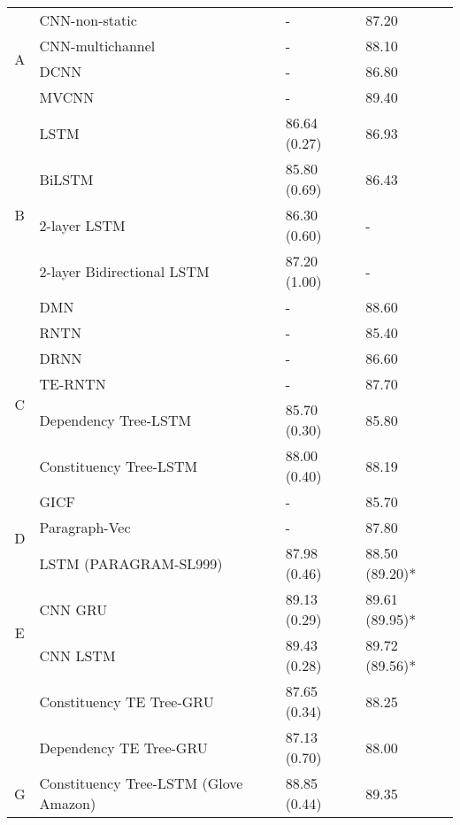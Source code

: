 \begin{table}[H]
\begin{tabular}{c|lll}
    \multirow{4}{*}{A} & CNN-non-static \cite{KimCNN} & - & 87.20\Tstrut \\
        & CNN-multichannel \cite{KimCNN} & - & 88.10 \\
    & DCNN \cite{DCNN} & - & 86.80 \\
    & MVCNN \cite{2-layer-cnn} & - & 89.40 \\ 
\hline
        \multirow{5}{*}{B} & LSTM \cite{originLSTM}    & 86.64 (0.27) & 86.93  \\
        & BiLSTM \cite{GravesLSTM}  & 85.80 (0.69) & 86.43   \\ 
        & 2-layer LSTM \cite{GravesLSTM} & 86.30 (0.60) & - \\
         & 2-layer Bidirectional LSTM \cite{GravesLSTM} & 87.20 (1.00) & - \\
         & DMN \cite{attention-gru} & - & 88.60 \\
\hline 
        \multirow{5}{*}{C} & RNTN \cite{socher2013recursive}  & - & 85.40  \\
        & DRNN \cite{IrsoyDRNN} & - & 86.60 \\ 
        & TE-RNTN \cite{tag-embedding-rnn} & - & 87.70 \\
        & Dependency Tree-LSTM   \cite{treeLSTM}  & 85.70 (0.30)  & 85.80 \\
         & Constituency Tree-LSTM  \cite{treeLSTM} & 88.00 (0.40)    &   88.19\\
\hline  
        \multirow{3}{*}{D} & GICF \cite{group-instance} & - & 85.70 \\
         & Paragraph-Vec \cite{ParagraphVec} & - & 87.80 \\
         & LSTM (PARAGRAM-SL999) \cite{wieting2015towards} & 87.98 (0.46) & 88.50 (89.20)*
          \\
\hline 
         \multirow{2}{*}{E}  & CNN GRU  \cite{cnn-rnn}                    & 89.13 (0.29)  &  89.61 (89.95)*    \\
         & CNN LSTM  \cite{cnn-rnn}                    & 89.43 (0.28)  & 89.72 (89.56)*\Bstrut    \\
\Xhline{3\arrayrulewidth}
\Xhline{3\arrayrulewidth}
         \multirow{2}{*}{F} & Constituency TE Tree-GRU                 & 87.65 (0.34) & 88.25\Tstrut \\
          & Dependency TE Tree-GRU                   & 87.13 (0.70)  & 88.00\Bstrut \\ 
\hline
\hline
        \multirow{1}{*}{G} & Constituency Tree-LSTM  \cite{treeLSTM} (Glove Amazon) & 88.85 (0.44) & 89.35\Tstrut\Bstrut \\

\end{tabular}
\end{table}
